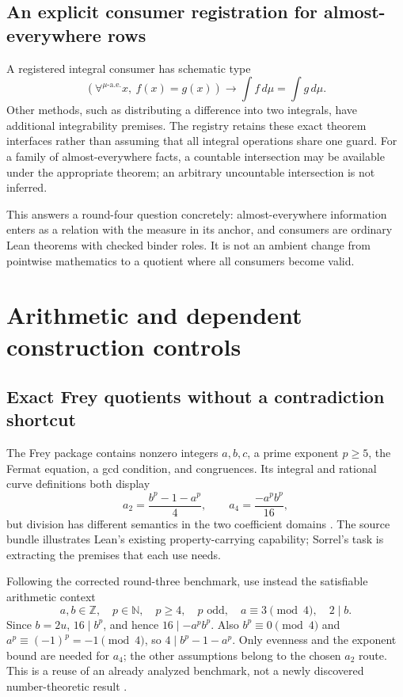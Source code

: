 \documentclass[11pt,a4paper]{article}
\newcommand{\N}{\mathbb N}\newcommand{\Z}{\mathbb Z}
\numberwithin{equation}{section}
\theoremstyle{definition}\newtheorem{definition}[theorem]{Definition}
\theoremstyle{remark}\newtheorem{remark}[theorem]{Remark}
\begin{document}
\subsection{An explicit consumer registration for almost-everywhere rows}
A registered integral consumer has schematic type
\[
 (\forall^{\mu\text{-a.e.}}x,\ f(x)=g(x))
 \longrightarrow \int f\,d\mu=\int g\,d\mu.
\]
Other methods, such as distributing a difference into two integrals, have
additional integrability premises. The registry retains these exact theorem
interfaces rather than assuming that all integral operations share one guard.
For a family of almost-everywhere facts, a countable intersection may be
available under the appropriate theorem; an arbitrary uncountable intersection
is not inferred.

This answers a round-four question concretely: almost-everywhere information
enters as a relation with the measure in its anchor, and consumers are ordinary
Lean theorems with checked binder roles. It is not an ambient change from
pointwise mathematics to a quotient where all consumers become valid.

\section{Arithmetic and dependent construction controls}\label{sec:controls}

\subsection{Exact Frey quotients without a contradiction shortcut}
The Frey package contains nonzero integers \(a,b,c\), a prime exponent
\(p\ge5\), the Fermat equation, a gcd condition, and congruences. Its integral
and rational curve definitions both display
\[
 a_2=\frac{b^p-1-a^p}{4},\qquad
 a_4=\frac{-a^p b^p}{16},
\]
but division has different semantics in the two coefficient domains
\cite{frey}. The source bundle illustrates Lean's existing property-carrying
capability; Sorrel's task is extracting the premises that each use needs.

Following the corrected round-three benchmark, use instead the satisfiable
arithmetic context
\begin{equation}\label{eq:f0}
 a,b\in\Z,\quad p\in\N,\quad p\ge4,\quad p\text{ odd},\quad
 a\equiv3\pmod4,\quad 2\mid b.
\end{equation}
Since \(b=2u\), \(16\mid b^p\), and hence \(16\mid-a^pb^p\).
Also \(b^p\equiv0\pmod4\) and \(a^p\equiv(-1)^p=-1\pmod4\), so
\(4\mid b^p-1-a^p\). Only evenness and the exponent bound are needed for
\(a_4\); the other assumptions belong to the chosen \(a_2\) route.
This is a reuse of an already analyzed benchmark, not a newly discovered
number-theoretic result \cite{synA,synB}.
\end{document}
